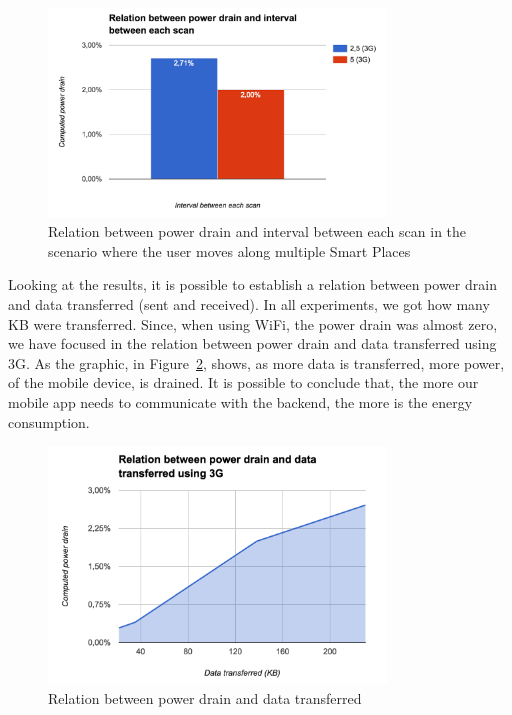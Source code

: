 \begin{figure}[!ht]
  \centering
    \includegraphics[width=0.8\textwidth, keepaspectratio]{images/results_battery_walking}
    \caption[Power drain when the user is moving]{Relation between power drain and interval between each scan in the scenario where the user moves along multiple Smart Places}
    \label{fig:results_battery_walking}
\end{figure}

Looking at the results, it is possible to establish a relation between power drain and data transferred (sent and received).
In all experiments, we got how many \gls{KB} were transferred.
Since, when using \gls{WiFi}, the power drain was almost zero, we have focused in the relation between power drain and data transferred using \gls{3G}.
As the graphic, in Figure~\ref{fig:results_battery_data}, shows, as more data is transferred, more power, of the mobile device, is drained.
It is possible to conclude that, the more our mobile app needs to communicate with the backend, the more is the energy consumption.

\begin{figure}[!ht]
  \centering
    \includegraphics[width=0.8\textwidth, keepaspectratio]{images/results_battery_data}
    \caption[Power drain vs Data transferred]{Relation between power drain and data transferred}
    \label{fig:results_battery_data}
\end{figure}

